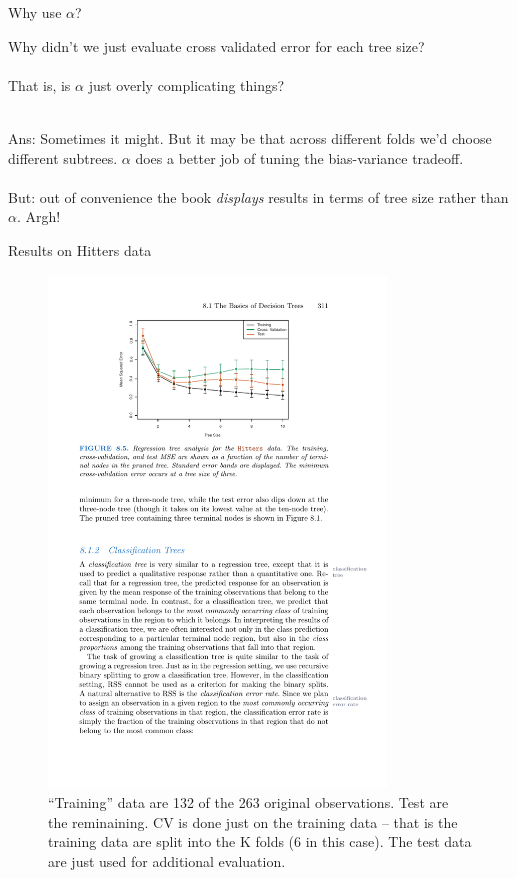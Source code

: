 \documentclass[mathserif, aspectratio=169]{beamer}
\begin{document}
\begin{frame}{Why use $\alpha$?}

Why didn't we just evaluate cross validated error for each tree size?\\~\\

That is, is $\alpha$ just overly complicating things?\\~\\

\pause

Ans: Sometimes it might.  But it may be that across different folds we'd choose different subtrees.  $\alpha$ does a better job of tuning the bias-variance tradeoff.  \\~\\

But: out of convenience the book \textit{displays} results in terms of tree size rather than $\alpha$.  Argh!

\end{frame}

\begin{frame}{Results on Hitters data}
\begin{figure}
\includegraphics[width=0.8\textwidth]{MSE_vs_treesize}
\caption*{``Training'' data are 132 of the 263 original observations.  Test are the reminaining.  CV is done just on the training data -- that is the training data are split into the K folds (6 in this case).  The test data are just used for additional evaluation.}
\end{figure}
\end{frame}
\end{document}
